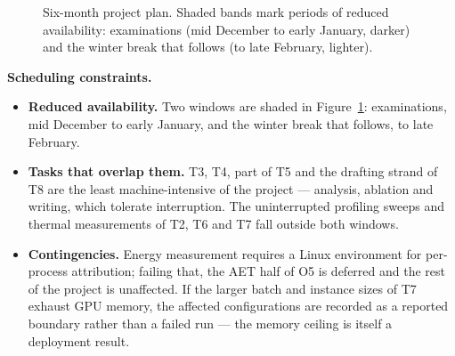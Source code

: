 \documentclass[11pt,a4paper]{article}
\begin{document}
\begin{figure}[htbp]
\centering
{}
\caption{Six-month project plan. Shaded bands mark periods of reduced
availability: examinations (mid December to early January, darker) and the winter
break that follows (to late February, lighter).}
\label{fig:gantt}
\end{figure}

\noindent\textbf{Scheduling constraints.}

\begin{itemize}[leftmargin=1.3em]

\item \textbf{Reduced availability.} Two windows are shaded in
Figure~\ref{fig:gantt}: examinations, mid December to early January, and the
winter break that follows, to late February.

\item \textbf{Tasks that overlap them.} T3, T4, part of T5 and the drafting
strand of T8 are the least machine-intensive of the project --- analysis,
ablation and writing, which tolerate interruption. The uninterrupted profiling
sweeps and thermal measurements of T2, T6 and T7 fall outside both windows.

\item \textbf{Contingencies.} Energy measurement requires a Linux environment for
per-process attribution; failing that, the AET half of O5 is deferred and the rest
of the project is unaffected. If the larger batch and instance sizes of T7 exhaust
GPU memory, the affected configurations are recorded as a reported boundary rather
than a failed run --- the memory ceiling is itself a deployment result.

\end{itemize}



\end{document}

